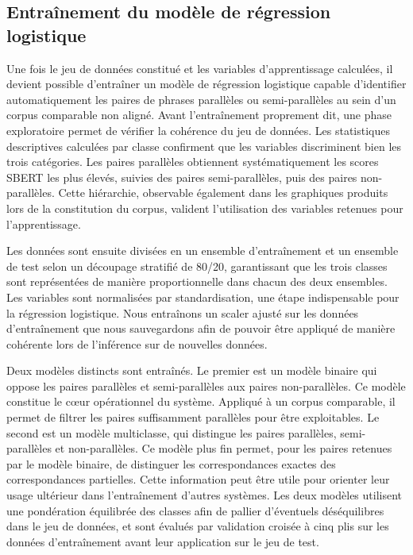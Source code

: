 \subsection{Entraînement du modèle de régression logistique}

Une fois le jeu de données constitué et les variables d'apprentissage calculées, il devient possible
d'entraîner un modèle de régression logistique capable d'identifier automatiquement les paires de phrases parallèles ou
semi-parallèles au sein d'un corpus comparable non aligné. Avant l'entraînement proprement dit, une phase exploratoire
permet de vérifier la cohérence du jeu de données.
Les statistiques descriptives calculées par classe confirment que les variables discriminent bien les trois
catégories. Les paires parallèles obtiennent systématiquement les scores SBERT les plus élevés, suivies
des paires semi-parallèles, puis des paires non-parallèles. Cette hiérarchie, observable également dans
les graphiques produits lors de la constitution du corpus, valident l'utilisation des variables retenues pour
l'apprentissage.

Les données sont ensuite divisées en un ensemble d'entraînement et un ensemble de test selon un découpage
stratifié de 80/20, garantissant que les trois classes sont représentées de manière proportionnelle dans
chacun des deux ensembles. Les variables sont normalisées par standardisation, une étape indispensable pour
la régression logistique. Nous entraînons un scaler
ajusté sur les données d'entraînement que nous sauvegardons afin de pouvoir être appliqué de manière cohérente lors
de l'inférence sur de nouvelles données.

Deux modèles distincts sont entraînés. Le premier est un modèle binaire qui oppose les paires parallèles
et semi-parallèles aux paires non-parallèles. Ce modèle constitue le c{\oe}ur opérationnel du système. Appliqué
à un corpus comparable, il permet de filtrer les paires suffisamment parallèles pour
être exploitables. Le second est un modèle multiclasse, qui distingue les paires
parallèles, semi-parallèles et non-parallèles. Ce modèle plus fin permet, pour les paires retenues par
le modèle binaire, de distinguer les correspondances exactes des correspondances partielles. Cette information
peut être utile pour orienter leur usage ultérieur dans l'entraînement d'autres systèmes. Les
deux modèles utilisent une pondération équilibrée des classes afin de pallier d'éventuels déséquilibres
dans le jeu de données, et sont évalués par validation croisée à cinq plis sur les données
d'entraînement avant leur application sur le jeu de test.

